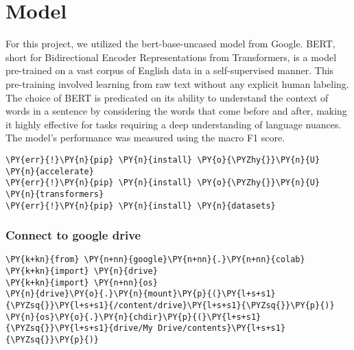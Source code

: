 \documentclass[../main.tex]{subfiles}
\begin{document}
\chapter{Model}
For this project, we utilized the bert-base-uncased model from Google. BERT, short for Bidirectional Encoder 
Representations from Transformers, is a model pre-trained on a vast corpus of English data in a self-supervised manner. 
This pre-training involved learning from raw text without any explicit human labeling. The choice of BERT is predicated 
on its ability to understand the context of words in a sentence by considering the words that come before and after, 
making it highly effective for tasks requiring a deep understanding of language nuances. The model's performance was 
measured using the macro F1 score.
\vspace{0.2in}



\begin{tcolorbox}[breakable, size=fbox, boxrule=1pt, pad at break*=1mm,colback=cellbackground, colframe=cellborder]
\begin{Verbatim}[commandchars=\\\{\}]
\PY{err}{!}\PY{n}{pip} \PY{n}{install} \PY{o}{\PYZhy{}}\PY{n}{U} \PY{n}{accelerate}
\PY{err}{!}\PY{n}{pip} \PY{n}{install} \PY{o}{\PYZhy{}}\PY{n}{U} \PY{n}{transformers}
\PY{err}{!}\PY{n}{pip} \PY{n}{install} \PY{n}{datasets}
\end{Verbatim}
\end{tcolorbox}

    \subsection{Connect to google drive}\label{connect-to-google-drive}

    \begin{tcolorbox}[breakable, size=fbox, boxrule=1pt, pad at break*=1mm,colback=cellbackground, colframe=cellborder]
\begin{Verbatim}[commandchars=\\\{\}]
\PY{k+kn}{from} \PY{n+nn}{google}\PY{n+nn}{.}\PY{n+nn}{colab} \PY{k+kn}{import} \PY{n}{drive}
\PY{k+kn}{import} \PY{n+nn}{os}
\PY{n}{drive}\PY{o}{.}\PY{n}{mount}\PY{p}{(}\PY{l+s+s1}{\PYZsq{}}\PY{l+s+s1}{/content/drive}\PY{l+s+s1}{\PYZsq{}}\PY{p}{)}
\PY{n}{os}\PY{o}{.}\PY{n}{chdir}\PY{p}{(}\PY{l+s+s1}{\PYZsq{}}\PY{l+s+s1}{drive/My Drive/contents}\PY{l+s+s1}{\PYZsq{}}\PY{p}{)}
\end{Verbatim}
\end{tcolorbox}
\end{document}
